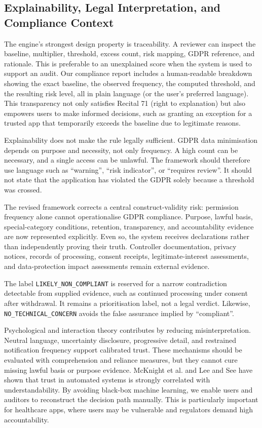 \subsection{Explainability, Legal Interpretation, and Compliance Context}

The engine's strongest design property is traceability. A reviewer can inspect the baseline, multiplier, threshold, excess count, risk mapping, GDPR reference, and rationale. This is preferable to an unexplained score when the system is used to support an audit. Our compliance report includes a human-readable breakdown showing the exact baseline, the observed frequency, the computed threshold, and the resulting risk level, all in plain language (or the user's preferred language). This transparency not only satisfies Recital 71 (right to explanation) but also empowers users to make informed decisions, such as granting an exception for a trusted app that temporarily exceeds the baseline due to legitimate reasons.

Explainability does not make the rule legally sufficient. GDPR data minimisation depends on purpose and necessity, not only frequency. A high count can be necessary, and a single access can be unlawful. The framework should therefore use language such as ``warning'', ``risk indicator'', or ``requires review''. It should not state that the application has violated the GDPR solely because a threshold was crossed.

The revised framework corrects a central construct-validity risk: permission frequency alone cannot operationalise GDPR compliance. Purpose, lawful basis, special-category conditions, retention, transparency, and accountability evidence are now represented explicitly. Even so, the system receives declarations rather than independently proving their truth. Controller documentation, privacy notices, records of processing, consent receipts, legitimate-interest assessments, and data-protection impact assessments remain external evidence.

The label \texttt{LIKELY\_NON\_COMPLIANT} is reserved for a narrow contradiction detectable from supplied evidence, such as continued processing under consent after withdrawal. It remains a prioritisation label, not a legal verdict. Likewise, \texttt{NO\_TECHNICAL\_CONCERN} avoids the false assurance implied by ``compliant''.

Psychological and interaction theory contributes by reducing misinterpretation. Neutral language, uncertainty disclosure, progressive detail, and restrained notification frequency support calibrated trust. These mechanisms should be evaluated with comprehension and reliance measures, but they cannot cure missing lawful basis or purpose evidence. McKnight et al. \cite{33} and Lee and See \cite{34} have shown that trust in automated systems is strongly correlated with understandability. By avoiding black‑box machine learning, we enable users and auditors to reconstruct the decision path manually. This is particularly important for healthcare apps, where users may be vulnerable and regulators demand high accountability.

